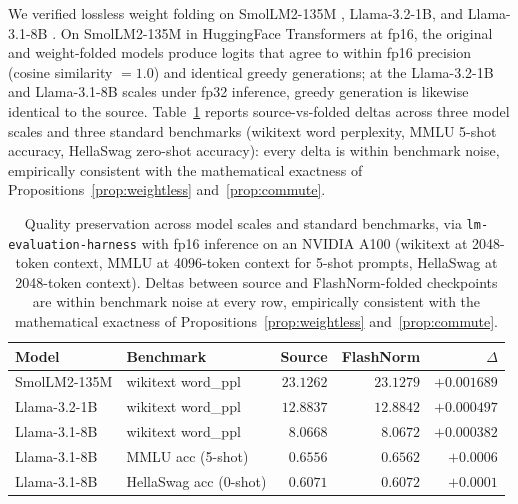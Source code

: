\documentclass{article}
\begin{document}
We verified lossless weight folding on SmolLM2-135M \citep{smollm}, Llama-3.2-1B, and Llama-3.1-8B \citep{LLaMA}.
On SmolLM2-135M in HuggingFace Transformers at fp16, the original and weight-folded models produce logits that agree to within fp16 precision (cosine similarity $= 1.0$) and identical greedy generations; at the Llama-3.2-1B and Llama-3.1-8B scales under fp32 inference, greedy generation is likewise identical to the source. Table~\ref{tab:quality} reports source-vs-folded deltas across three model scales and three standard benchmarks (wikitext word perplexity, MMLU 5-shot accuracy, HellaSwag zero-shot accuracy): every delta is within benchmark noise, empirically consistent with the mathematical exactness of Propositions~\ref{prop:weightless} and~\ref{prop:commute}.

\begin{table}[h!] \centering
\caption{Quality preservation across model scales and standard benchmarks, via \texttt{lm-evaluation-harness} with fp16 inference on an NVIDIA A100 (wikitext at 2048-token context, MMLU at 4096-token context for 5-shot prompts, HellaSwag at 2048-token context). Deltas between source and FlashNorm-folded checkpoints are within benchmark noise at every row, empirically consistent with the mathematical exactness of Propositions~\ref{prop:weightless} and~\ref{prop:commute}.}
\label{tab:quality}
\begin{tabular}{l l r r r}
\hline
Model & Benchmark & Source & FlashNorm & $\Delta$ \\
\hline
SmolLM2-135M & wikitext word\_ppl          & $23.1262$ & $23.1279$ & $+0.001689$ \\
Llama-3.2-1B & wikitext word\_ppl          & $12.8837$ & $12.8842$ & $+0.000497$ \\
Llama-3.1-8B & wikitext word\_ppl          & $8.0668$  & $8.0672$  & $+0.000382$ \\
Llama-3.1-8B & MMLU acc (5-shot)           & $0.6556$  & $0.6562$  & $+0.0006$ \\
Llama-3.1-8B & HellaSwag acc (0-shot)      & $0.6071$  & $0.6072$  & $+0.0001$ \\
\hline
\end{tabular}
\end{table}
\end{document}
